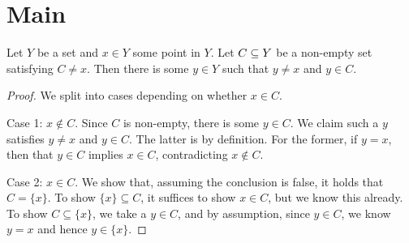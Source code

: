 %

\section{Main}

\begin{lemma}
\label{small_lemma}
\leanok

Let $Y$ be a set and $x \in Y$ some point in $Y$. Let $C \subseteq Y$ be a non-empty set satisfying $C \ne {x}$. Then there is some $y \in Y$ such that $y \ne x$ and $y \in C$.
\end{lemma}

\begin{proof}
\leanok 

We split into cases depending on whether $x \in C$.

\vs

Case 1: $x \not \in C$. Since $C$ is non-empty, there is some $y \in C$. 
We claim such a $y$ satisfies $y \ne x$ and $y \in C$. The latter is by definition.
For the former, if $y = x$, then that $y \in C$ implies $x \in C$, contradicting $x \not \in C$.

\vs

Case 2: $x \in C$. We show that, assuming the conclusion is false, it holds that $C = \{x\}$. 
To show $\{x\} \subseteq C$, it suffices to show $x \in C$, but we know this already. To show
$C \subseteq \{x\}$, we take a $y \in C$, and by assumption, since $y \in C$, we know $y = x$
and hence $y \in \{x\}$.
\end{proof}



    
